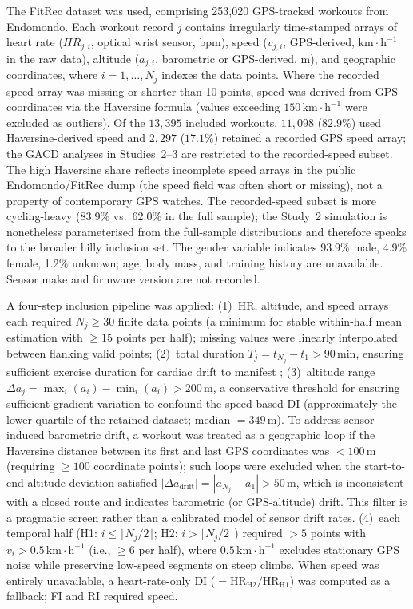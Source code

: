 \documentclass[times, twoside]{zHenriquesLab-StyleBioRxiv}
\begin{document}
The FitRec dataset \cite{ni2019} was used, comprising 253,020 GPS-tracked workouts from Endomondo. Each workout record $j$ contains irregularly time-stamped arrays of heart rate ($\mathit{HR}_{j,i}$, optical wrist sensor, $\mathrm{bpm}$), speed ($v_{j,i}$, GPS-derived, $\mathrm{km{\cdot}h^{-1}}$ in the raw data), altitude ($a_{j,i}$, barometric or GPS-derived, $\mathrm{m}$), and geographic coordinates, where $i = 1, \ldots, N_j$ indexes the data points. Where the recorded speed array was missing or shorter than 10 points, speed was derived from GPS coordinates via the Haversine formula (values exceeding $150\,\mathrm{km{\cdot}h^{-1}}$ were excluded as outliers). Of the $13{,}395$ included workouts, $11{,}098$ ($82.9\%$) used Haversine-derived speed and $2{,}297$ ($17.1\%$) retained a recorded GPS speed array; the GACD analyses in Studies~2--3 are restricted to the recorded-speed subset. The high Haversine share reflects incomplete speed arrays in the public Endomondo/FitRec dump (the speed field was often short or missing), not a property of contemporary GPS watches. The recorded-speed subset is more cycling-heavy (83.9\% vs.\ 62.0\% in the full sample); the Study~2 simulation is nonetheless parameterised from the full-sample distributions and therefore speaks to the broader hilly inclusion set. The gender variable indicates 93.9\% male, 4.9\% female, 1.2\% unknown; age, body mass, and training history are unavailable. Sensor make and firmware version are not recorded.

A four-step inclusion pipeline was applied: (1)~HR, altitude, and speed arrays each required $N_j \geq 30$ finite data points (a minimum for stable within-half mean estimation with $\geq 15$ points per half); missing values were linearly interpolated between flanking valid points; (2)~total duration $T_j = t_{N_j} - t_1 > 90\,\mathrm{min}$, ensuring sufficient exercise duration for cardiac drift to manifest \cite{coyle2001}; (3)~altitude range $\Delta a_j = \max_i(a_i) - \min_i(a_i) > 200\,\mathrm{m}$, a conservative threshold for ensuring sufficient gradient variation to confound the speed-based DI (approximately the lower quartile of the retained dataset; median $= 349\,\mathrm{m}$). To address sensor-induced barometric drift, a workout was treated as a geographic loop if the Haversine distance between its first and last GPS coordinates was $< 100\,\mathrm{m}$ (requiring $\geq 100$ coordinate points); such loops were excluded when the start-to-end altitude deviation satisfied $|\Delta a_{\text{drift}}| = |a_{N_j} - a_1| > 50\,\mathrm{m}$, which is inconsistent with a closed route and indicates barometric (or GPS-altitude) drift. This filter is a pragmatic screen rather than a calibrated model of sensor drift rates. (4)~each temporal half (H1: $i \leq \lfloor N_j/2 \rfloor$; H2: $i > \lfloor N_j/2 \rfloor$) required $> 5$ points with $v_i > 0.5\,\mathrm{km{\cdot}h^{-1}}$ (i.e., $\geq 6$ per half), where $0.5\,\mathrm{km{\cdot}h^{-1}}$ excludes stationary GPS noise while preserving low-speed segments on steep climbs. When speed was entirely unavailable, a heart-rate-only DI ($= \bar{\text{HR}}_{\text{H2}} / \bar{\text{HR}}_{\text{H1}}$) was computed as a fallback; FI and RI required speed.
\end{document}
